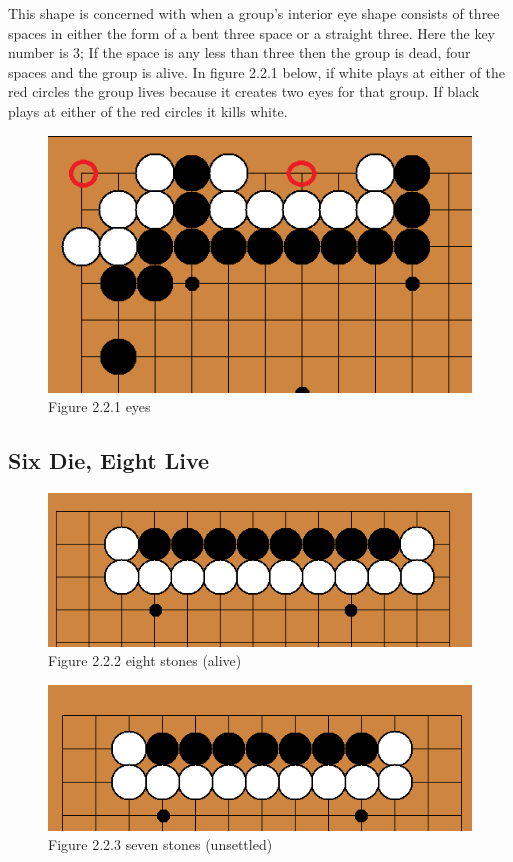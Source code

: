 \documentclass{l3proj}
\begin{document}
This shape is concerned with when a group’s interior eye shape consists of three spaces in either the form of a bent three space or a straight three. Here the key number is 3; If the space is any less than three then the group is dead, four spaces and the group is alive. In figure 2.2.1 below, if white plays at either of the red circles the group lives because it creates two eyes for that group. If black plays at either of the red circles it kills white.

\begin{figure}[H]
\centering
\includegraphics[scale=0.5]{Images/unsettled3.png}
\caption{Figure 2.2.1 eyes}
\end{figure}

\subsection{Six Die, Eight Live}

\begin{figure}[H]
\centering
\includegraphics[scale=0.5]{Images/eightlive.png}
\caption{Figure 2.2.2 eight stones (alive)}
\end{figure}

\begin{figure}[H]
\centering
\includegraphics[scale=0.5]{Images/sevenunsettled.png}
\caption{Figure 2.2.3 seven stones (unsettled)}
\end{figure}
\end{document}
